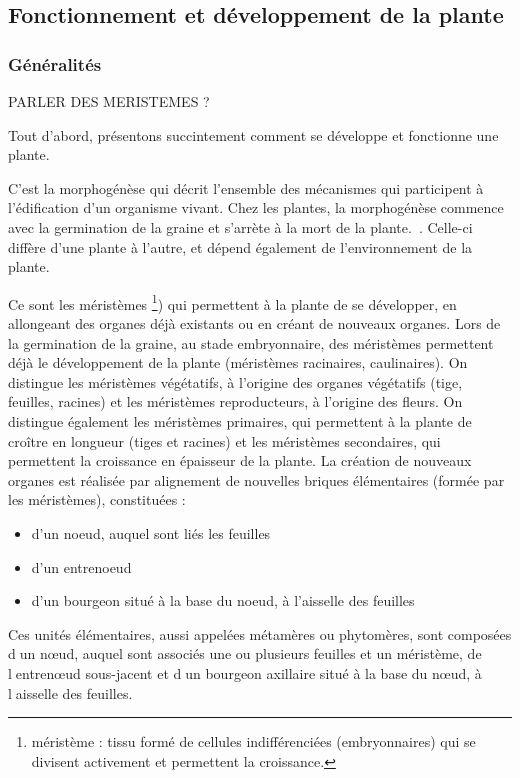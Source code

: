 \subsection{Fonctionnement et développement de la plante}

\subsubsection{Généralités}

PARLER DES MERISTEMES ?

Tout d'abord, présentons succintement comment se développe et fonctionne une plante. 

C'est la morphogénèse qui décrit l'ensemble des mécanismes qui participent à l'édification d'un organisme vivant. 
Chez les plantes, la morphogénèse commence avec la germination de la graine et s'arrète à la mort de la plante.~\cite[p.~22]{these_modelisation}.
Celle-ci diffère d'une plante à l'autre, et dépend également de l'environnement de la plante.

Ce sont les méristèmes \footnote{méristème : tissu formé de cellules indifférenciées (embryonnaires) qui se divisent activement et permettent la croissance.}) qui permettent à la plante de se développer, en allongeant des organes déjà existants ou en créant de nouveaux organes.
Lors de la germination de la graine, au stade embryonnaire, des méristèmes permettent déjà le développement de la plante (méristèmes racinaires, caulinaires).
On distingue les méristèmes végétatifs, à l’origine des organes végétatifs (tige, feuilles, racines) et les méristèmes reproducteurs, à l’origine des fleurs.
On distingue également les méristèmes primaires, qui permettent à la plante de croître en longueur (tiges et racines) et les méristèmes secondaires, qui permettent la croissance en épaisseur de la plante.
La création de nouveaux organes est réalisée par alignement de nouvelles briques élémentaires (formée par les méristèmes), constituées :
\begin{itemize}
	\item d'un noeud, auquel sont liés les feuilles
	\item d'un entrenoeud 
	\item d'un bourgeon situé à la base du noeud, à l'aisselle des feuilles
\end{itemize} 




 Ces unités élémentaires, aussi appelées métamères ou phytomères, sont composées dun nœud, auquel sont associés une ou plusieurs feuilles et un méristème, de lentrenœud sous-jacent et dun bourgeon axillaire situé à la base du nœud, à laisselle des feuilles.


